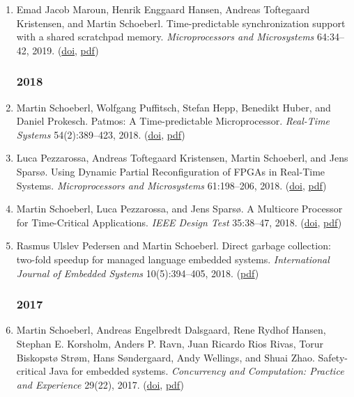 \begin{enumerate}
\item Emad Jacob Maroun, Henrik Enggaard Hansen, Andreas Toftegaard Kristensen, and Martin Schoeberl.
 Time-predictable synchronization support with a shared scratchpad memory.
 \emph{Microprocessors and Microsystems} 64:34--42, 2019.
(\href{http://dx.doi.org/10.1016/j.micpro.2018.09.014}{doi}, \href{https://www.jopdesign.com/doc/spmsync-jnl.pdf}{pdf})


\subsubsection*{2018}

\item Martin Schoeberl, Wolfgang Puffitsch, Stefan Hepp, Benedikt Huber, and Daniel Prokesch.
 Patmos: A Time-predictable Microprocessor.
 \emph{Real-Time Systems} 54(2):389--423, 2018.
(\href{http://dx.doi.org/10.1007/s11241-018-9300-4}{doi}, \href{https://www.jopdesign.com/doc/patmos.pdf}{pdf})

\item Luca Pezzarossa, Andreas Toftegaard Kristensen, Martin Schoeberl, and Jens Spars{\o}.
 Using Dynamic Partial Reconfiguration of FPGAs in Real-Time Systems.
 \emph{Microprocessors and Microsystems} 61:198--206, 2018.
(\href{http://dx.doi.org/https://doi.org/10.1016/j.micpro.2018.05.017}{doi}, \href{https://www.jopdesign.com/doc/dpr-hls-jnl.pdf}{pdf})

\item Martin Schoeberl, Luca Pezzarossa, and Jens Spars{\o}.
 A Multicore Processor for Time-Critical Applications.
 \emph{IEEE Design Test} 35:38--47, 2018.
(\href{http://dx.doi.org/10.1109/MDAT.2018.2791809}{doi}, \href{http://www.jopdesign.com/doc/timecritcmp.pdf}{pdf})

\item Rasmus Ulslev Pedersen and Martin Schoeberl.
 Direct garbage collection: two-fold speedup for managed language embedded systems.
 \emph{International Journal of Embedded Systems} 10(5):394--405, 2018.
(\href{https://www.jopdesign.com/doc/gcmem.pdf}{pdf})


\subsubsection*{2017}

\item Martin Schoeberl, Andreas Engelbredt Dalsgaard, Rene Rydhof Hansen, Stephan E. Korsholm, Anders P. Ravn, Juan Ricardo Rios Rivas, Torur Biskopst{\o} Str{\o}m, Hans S{\o}ndergaard, Andy Wellings, and Shuai Zhao.
 Safety-critical Java for embedded systems.
 \emph{Concurrency and Computation: Practice and Experience} 29(22), 2017.
(\href{http://dx.doi.org/10.1002/cpe.3963}{doi}, \href{http://www.jopdesign.com/doc/cj4es-jnl.pdf}{pdf})


\end{enumerate}
